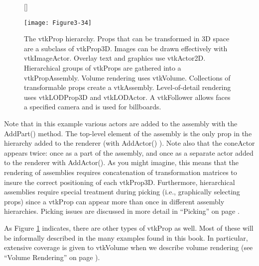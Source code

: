 \begin{figure}[!htb]
[\FBwidth]
{\caption{The vtkProp hierarchy.
Props that can be transformed in 3D space are a subclass of
vtkProp3D. Images can be drawn effectively with vtkImageActor.
Overlay text and graphics use vtkActor2D. Hierarchical groups
of vtkProps are gathered into a vtkPropAssembly. Volume rendering
uses vtkVolume. Collections of transformable props create a
vtkAssembly. Level-of-detail rendering uses vtkLODProp3D and
vtkLODActor. A vtkFollower allows faces a specified camera
and is used for billboards.}\label{fig:Figure3-34}}
{\texttt{[image: Figure3-34]}}
\end{figure}


Note that in this example various actors are added to the assembly with the AddPart() method. The top-level element of the assembly is the only prop in the hierarchy added to the renderer (with AddActor() ). Note also that the coneActor appears twice: once as a part of the assembly, and once as a separate actor added to the renderer with AddActor(). As you might imagine, this means that the rendering of assemblies requires concatenation of transformation matrices to insure the correct positioning of each vtkProp3D. Furthermore, hierarchical assemblies require special treatment during picking (i.e., graphically selecting props) since a vtkProp can appear more than once in different assembly hierarchies. Picking issues are discussed in more detail in ``Picking'' on page \pageref{sec:picking}.

As Figure \ref{fig:Figure3-34} indicates, there are other types of vtkProp as well. Most of these will be informally described in the many examples found in this book. In particular, extensive coverage is given to vtkVolume when we describe volume rendering (see ``Volume Rendering'' on page \pageref{sec:volume_rendering}).


